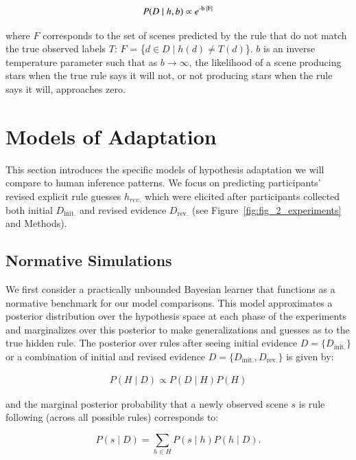 \documentclass[doc,natbib,floatsintext]{apa7}
\newcommand{\dr}{D_{\mathrm{rev.}}}%
\newcommand{\di}{D_{\mathrm{init.}}}%
\begin{document}
\begin{equation}
    P(D\mid h, b) \propto e\textsuperscript{-b |F|}
\label{equ:equ_3_likelihood}
\end{equation}

where $F$ corresponds to the set of scenes predicted by the rule that do not match the true observed labels $T$: $F$ = \{\(d \in D \mid h(d) \ne T(d)\)\}. \(b\) is an inverse temperature parameter such that as \(b\to\infty\), the likelihood of a scene producing stars when the true rule says it will not, or not producing stars when the rule says it will, approaches zero.

\section{Models of Adaptation}
This section introduces the specific models of hypothesis adaptation we will compare to human inference patterns. We focus on predicting participants' revised explicit rule guesses $h_{rev.}$ which were elicited after participants collected both initial $\di$ and revised evidence $\dr$ (see Figure~\ref{fig:fig_2_experiments} and Methods). 

\subsection{Normative Simulations}
We first consider a practically unbounded Bayesian learner that functions as a normative benchmark for our model comparisons. This model approximates a posterior distribution over the hypothesis space at each phase of the experiments and marginalizes over this posterior to make generalizations and guesses as to the true hidden rule. The posterior over rules after seeing initial evidence $D = \{\di\}$ or a combination of initial and revised evidence $D = \{\di,\dr\}$ is given by:

\begin{align}
    P(H\mid D)\propto P(D\mid H)P(H)
\label{equ:equ_4_posterior}
\end{align}

and the marginal posterior probability that a newly observed scene $s$
is rule following (across all possible rules) corresponds to:

\begin{equation}
    P(s\mid D) = \sum_{h\in H}P(s\mid h)P(h\mid D).
\label{equ:equ_5_marginal_label_prob}
\end{equation}
\end{document}
